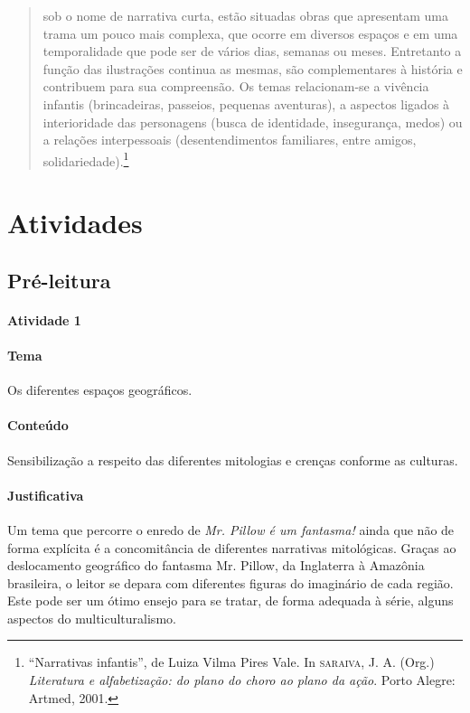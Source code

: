 \documentclass[11pt]{extarticle}
\begin{document}
\begin{quote}
sob o nome de narrativa curta, estão situadas obras que apresentam uma trama 
um pouco mais complexa, que ocorre em diversos espaços e em uma temporalidade 
que pode ser de vários dias, semanas ou meses. Entretanto a função das ilustrações 
continua as mesmas, são complementares à história e contribuem para sua compreensão. 
Os temas relacionam-se a vivência infantis (brincadeiras, passeios, pequenas aventuras), 
a aspectos ligados à interioridade das personagens (busca de identidade, insegurança, 
medos) ou a relações interpessoais (desentendimentos familiares, entre amigos, solidariedade).\footnote{“Narrativas infantis”, de Luiza Vilma Pires Vale. In \textsc{saraiva}, J. A. (Org.) \textit{Literatura e alfabetização: do plano do choro ao plano da ação}. Porto Alegre: Artmed, 2001.} 
\end{quote}


\section{Atividades}

\subsection{Pré-leitura}

\paragraph{Atividade 1}


\paragraph{Tema} Os diferentes espaços geográficos.

\paragraph{Conteúdo} Sensibilização a respeito das diferentes mitologias
e crenças conforme as culturas.

\paragraph{Justificativa} Um tema que percorre o enredo de \textit{Mr. Pillow é um fantasma!}
ainda que não de forma explícita é a concomitância de diferentes narrativas mitológicas.
Graças ao deslocamento geográfico do fantasma Mr. Pillow, da Inglaterra à Amazônia brasileira, 
o leitor se depara com diferentes figuras do imaginário de cada região. 
Este pode ser um ótimo ensejo para se tratar, de forma adequada à série,
alguns aspectos do multiculturalismo. 
\end{document}
